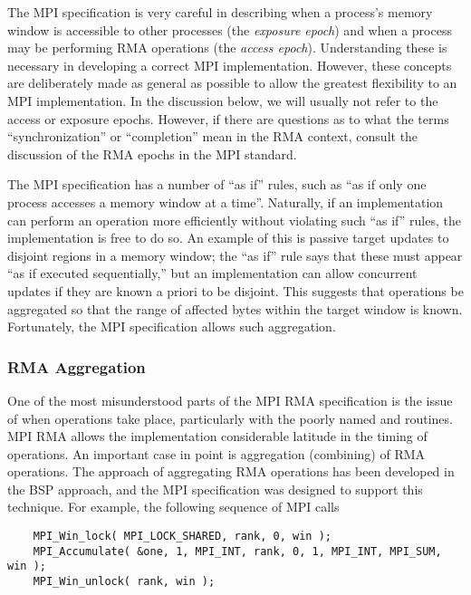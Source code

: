%
The MPI specification is very careful in describing when a process's
memory window is accessible to other processes (the \emph{exposure
epoch}) and when a process
may be performing RMA operations (the 
\emph{access epoch}).
Understanding these is necessary in developing 
a correct MPI implementation.  However, these concepts are
deliberately made as general as possible to allow the greatest
flexibility to an MPI implementation.  In the discussion below, we
will usually not refer to the access or exposure epochs.  However, if
there are questions as to what the terms ``synchronization'' or
``completion'' mean in the RMA context, consult the discussion of the
RMA epochs in the MPI standard.

The MPI specification has a number of ``as if'' rules, such as ``as if
only one process accesses a memory window at a time''.  Naturally, if
an implementation can perform an operation more efficiently without
violating such ``as if'' rules, the implementation is free to do so.
An example of this is passive target updates to disjoint regions in a
memory window; 
the ``as if'' rule says that these must appear ``as if executed
sequentially,'' but an implementation can allow concurrent updates if
they are known a priori to be disjoint.  This suggests that operations
be aggregated so that the range of affected bytes within the target
window is known.  Fortunately, the MPI specification allows such aggregation.

\subsubsection{RMA Aggregation}
One of the most misunderstood parts of the MPI RMA specification is
the issue of when operations take place, particularly with the poorly
named  and  routines.  MPI RMA
allows the implementation considerable latitude in the timing of
operations.  An important case in point is aggregation (combining) of RMA
operations.  The approach of aggregating RMA operations has been
developed in the BSP approach, and the MPI specification was designed
to support this technique.  For example, the following sequence of MPI
calls

\begin{small}
\begin{verbatim}
    MPI_Win_lock( MPI_LOCK_SHARED, rank, 0, win );
    MPI_Accumulate( &one, 1, MPI_INT, rank, 0, 1, MPI_INT, MPI_SUM, win );
    MPI_Win_unlock( rank, win );
\end{verbatim}
\end{small}

